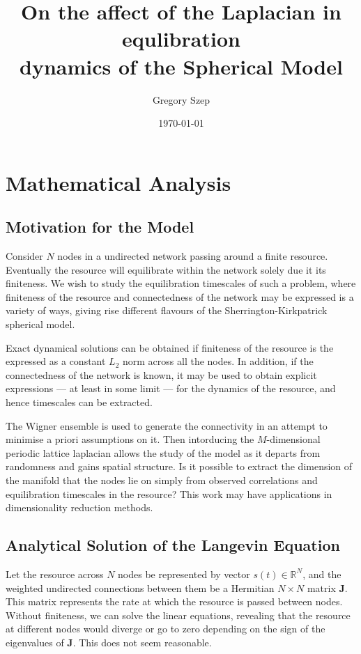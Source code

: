 \documentclass{article}[12pt]
\numberwithin{equation}{section}
\begin{document}
\title{
On the affect of the Laplacian in equlibration\\
dynamics of the Spherical Model
}

\author{Gregory Szep}
\date{\today}
\maketitle

\section{Mathematical Analysis}
\vspace{-10pt}
\subsection{Motivation for the Model}
Consider $N$ nodes in a undirected network passing around a finite resource.
Eventually the resource will equilibrate within the network solely due it its
finiteness. We wish to study the equilibration timescales of such a problem,
where finiteness of the resource and connectedness of the network may be
expressed is a variety of ways, giving rise different flavours of the
Sherrington-Kirkpatrick spherical model.

Exact dynamical solutions can be obtained if finiteness of the resource
is the expressed as a constant $L_2$ norm across all the nodes. In addition,
if the connectedness of the network is known, it may be used to obtain explicit
expressions --- at least in some limit --- for the dynamics of the resource,
and hence timescales can be extracted.

The Wigner ensemble is used to generate the connectivity in an attempt to
minimise a priori assumptions on it. Then intorducing the $M$-dimensional
periodic lattice laplacian allows the study of the model as it departs from
randomness and gains spatial structure. Is it possible to extract the dimension
of the manifold that the nodes lie on simply from observed correlations and
equilibration timescales in the resource? This work may have applications in
dimensionality reduction methods.

\subsection{Analytical Solution of the Langevin Equation}
Let the resource across $N$ nodes be represented by vector $s(t)\in\mathbb{R}^N$,
and the weighted undirected connections between them be a Hermitian $N\times N$ matrix
$\mathbf{J}$. This matrix represents the rate at which the resource is passed between
nodes. Without finiteness, we can solve the linear equations, revealing that
the resource at different nodes would diverge or go to zero depending on the sign
of the eigenvalues of $\mathbf{J}$. This does not seem reasonable.
\end{document}
